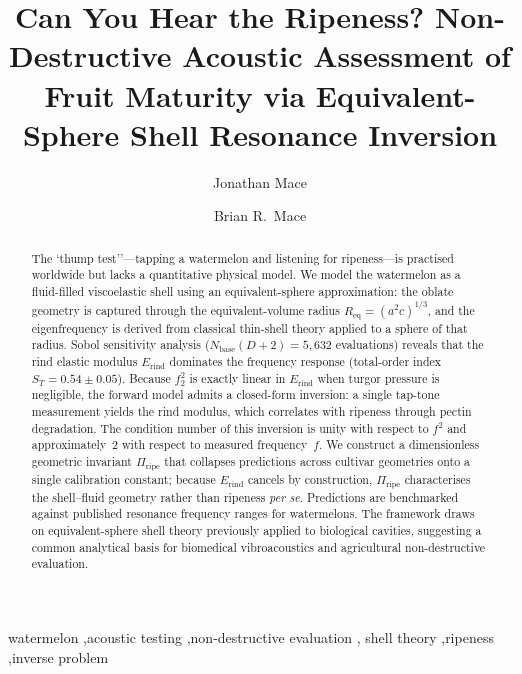 \documentclass[review]{elsarticle}
\begin{document}
\begin{frontmatter}

\title{Can You Hear the Ripeness? Non-Destructive Acoustic Assessment of
Fruit Maturity via Equivalent-Sphere Shell Resonance Inversion}

\author[msr]{Jonathan Mace}

\author[auckland]{Brian R.\ Mace}



\begin{abstract}
The `thump test''---tapping a watermelon and listening for
ripeness---is practised worldwide but lacks a quantitative physical
model.  We model the watermelon as a fluid-filled viscoelastic shell
using an equivalent-sphere approximation: the oblate geometry is
captured through the equivalent-volume radius
$R_{\mathrm{eq}} = (a^{2}c)^{1/3}$, and the eigenfrequency is
derived from classical thin-shell theory applied to a sphere of that
radius.  Sobol sensitivity analysis
($N_{\mathrm{base}}(D{+}2) = 5{,}632$ evaluations) reveals that the
rind elastic modulus $E_{\mathrm{rind}}$ dominates the
frequency response (total-order index $S_T = 0.54 \pm 0.05$).  Because $f_2^2$
is exactly linear in $E_{\mathrm{rind}}$ when turgor pressure is
negligible, the forward model admits a closed-form inversion: a single
tap-tone measurement yields the rind modulus, which correlates with
ripeness through pectin degradation.  The condition number of this
inversion is unity with respect to $f^2$ and approximately~2 with
respect to measured frequency~$f$.  We construct a dimensionless
geometric invariant $\Pi_{\mathrm{ripe}}$ that collapses
predictions across cultivar geometries onto a single calibration
constant; because $E_{\mathrm{rind}}$
cancels by construction, $\Pi_{\mathrm{ripe}}$ characterises the
shell--fluid geometry rather than ripeness \emph{per se}.  Predictions
are benchmarked against published resonance frequency ranges for
watermelons.  The framework
draws on equivalent-sphere shell theory previously applied to
biological cavities, suggesting a common analytical basis for
biomedical vibroacoustics and agricultural non-destructive evaluation.
\end{abstract}

\begin{keyword}
watermelon \sep acoustic testing \sep non-destructive evaluation \sep
shell theory \sep ripeness \sep inverse problem
\end{keyword}

\end{frontmatter}
\end{document}

